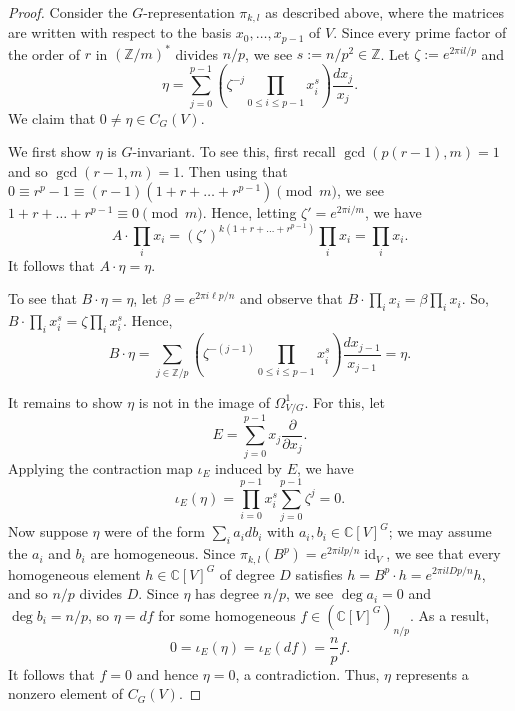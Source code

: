 \documentclass{amsart}
\theoremstyle{definition}
\newcommand{\ZZ}{\mathbb{Z}}
\newcommand{\CC}{\mathbb{C}}
\DeclareMathOperator{\id}{id}
\begin{document}

\begin{proof}%
Consider the $G$-representation $\pi_{k,l}$ as described above, where the matrices are written with respect to the basis $x_0,\ldots,x_{p-1}$ of $V$. Since every prime factor of the order of $r$ in $(\ZZ/m)^*$ divides $n/p$, we see $s:=n/p^2\in\ZZ$. Let $\zeta:=e^{2\pi il/p}$ and
\[
 \eta=
 \sum_{j=0}^{p-1} \left(\zeta^{-j} \prod_{0\leq i\leq p-1}x_i^s\right)\frac{dx_j}{x_j}.
\]
We claim that $0\neq\eta\in C_G(V)$.

We first show $\eta$ is $G$-invariant. To see this, first recall $\gcd(p(r-1),m)=1$ and so $\gcd(r-1,m)=1$. Then using that $0\equiv r^p-1\equiv (r-1)(1+r+\dots+r^{p-1})\pmod{m}$, we see $1+r+\dots+r^{p-1}\equiv0\pmod{m}$. Hence, letting $\zeta'=e^{2\pi i/m}$, we have
\[
    A\cdot \prod_i x_i=(\zeta')^{k(1+r+\dots+r^{p-1})}\prod_i x_i=\prod_i x_i.
\]
It follows that $A\cdot\eta=\eta$.

To see that $B\cdot\eta=\eta$, let $\beta=e^{2\pi i\ell p/n}$ and observe that $B\cdot \prod_i x_i=\beta\prod_i x_i$. So, $B\cdot\prod_i x_i^s=\zeta\prod_i x_i^s$. Hence,
\[
    B\cdot\eta=\sum_{j\in\ZZ/p} \left(\zeta^{-(j-1)} \prod_{0\leq i\leq p-1}x_i^s\right)\frac{dx_{j-1}}{x_{j-1}} = \eta.
\]

It remains to show $\eta$ is not in the image of $\Omega_{V/G}^1$. For this, let 
\[
 E=\sum_{j=0}^{p-1}x_j\frac{\partial}{\partial x_j}.
\]
Applying the contraction map $\iota_E$ induced by $E$, we have
\[
 \iota_E(\eta)=
 \prod_{i=0}^{p-1}x_i^s\sum_{j=0}^{p-1}\zeta^j=0.
\]
Now suppose $\eta$ were of the form $\sum_i a_i db_i$ with $a_i,b_i\in\CC[V]^G$; we may assume the $a_i$ and $b_i$ are homogeneous. Since $\pi_{k,l}(B^p)=e^{2\pi i lp/n}\id_V$, we see that every homogeneous element $h\in\CC[V]^G$ of degree $D$ satisfies $h=B^p\cdot h=e^{2\pi i lDp/n}h$, and so $n/p$ divides $D$. Since $\eta$ has degree $n/p$, we see $\deg a_i=0$ and $\deg b_i=n/p$, so $\eta=df$ for some homogeneous $f\in(\CC[V]^G)_{n/p}$. As a result,
\[
 0=\iota_E(\eta)=\iota_E(df)=\frac np f.
\]
It follows that $f=0$ and hence $\eta=0$, a contradiction. Thus, $\eta$ represents a nonzero element of $C_G(V)$.
\end{proof}
\end{document}
